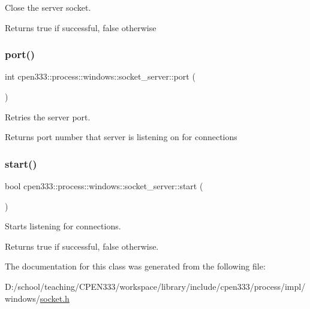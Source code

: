 Close the server socket. 

\begin{DoxyReturn}{Returns}
true if successful, false otherwise 
\end{DoxyReturn}
\mbox{\label{classcpen333_1_1process_1_1windows_1_1socket__server_a4b5f9231c046f947a77a6458202c2712}} 
\subsubsection{\texorpdfstring{port()}{port()}}
{\footnotesize\ttfamily int cpen333\+::process\+::windows\+::socket\+\_\+server\+::port (\begin{DoxyParamCaption}{ }\end{DoxyParamCaption})\hspace{0.3cm}{\ttfamily [inline]}}



Retries the server port. 

\begin{DoxyReturn}{Returns}
port number that server is listening on for connections 
\end{DoxyReturn}
\mbox{\label{classcpen333_1_1process_1_1windows_1_1socket__server_a0a2021766c8d5728d044a96d24bbc684}} 
\subsubsection{\texorpdfstring{start()}{start()}}
{\footnotesize\ttfamily bool cpen333\+::process\+::windows\+::socket\+\_\+server\+::start (\begin{DoxyParamCaption}{ }\end{DoxyParamCaption})\hspace{0.3cm}{\ttfamily [inline]}}



Starts listening for connections. 

\begin{DoxyReturn}{Returns}
true if successful, false otherwise. 
\end{DoxyReturn}


The documentation for this class was generated from the following file\+:\begin{DoxyCompactItemize}
\item 
D\+:/school/teaching/\+C\+P\+E\+N333/workspace/library/include/cpen333/process/impl/windows/\hyperlink{impl_2windows_2socket_8h}{socket.\+h}\end{DoxyCompactItemize}
